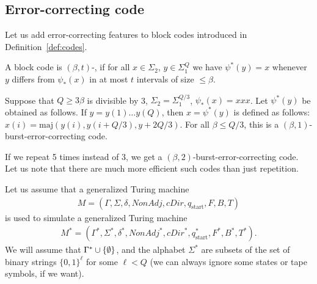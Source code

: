 \documentclass[12pt]{memoir}
\renewcommand{\le}{\leq}
\newcommand{\fld}[1]{\ensuremath{\textit{#1}}}
\newcommand{\maj}{\mathrm{maj}}
\def\B{B}
\newcommand{\Tu}{T}
\newcommand{\Tus}{T^{*}}
\newcommand{\cDir}{\fld{cDir}}
\newcommand{\NonAdj}{\fld{NonAdj}}
\newcommand{\start}{\mathrm{start}}
\begin{document}
\subsection{Error-correcting code}\label{sec:coding}

Let us add error-correcting features to block codes introduced in
Definition~\ref{def:codes}.

\begin{sloppypar}
\begin{definition}\label{def:err-code}
A block code is \( (\beta,t) \)-,
if for all \( x\in\Sigma_{2} \), \( y\in\Sigma_{1}^{Q} \) we
have \( \psi^{*}(y)=x \) whenever \( y \) differs from
\( \psi_{*}(x) \) in at most \( t \) intervals of size \( \le\beta \).
\end{definition}
  \end{sloppypar}

\begin{example}\label{xmp:tripling}
  Suppose that \( Q\ge 3\beta \) is divisible by 3,
  \( \Sigma_{2}=\Sigma_{1}^{Q/3} \), \( \psi_{*}(x)=xxx \).
  Let \( \psi^{*}(y) \) be obtained as follows.
  If \( y=y(1)\dots y(Q) \), then \( x=\psi^{*}(y) \) is defined as follows:
    \( x(i)=\maj(y(i),y(i+Q/3),y+2Q/3) \).
    For all \( \beta\le Q/3 \), this is a
    \( (\beta,1) \)-burst-error-correcting code.

    If we repeat 5 times instead of 3, we get a \( (\beta,2) \)-burst-error-correcting
    code.
    Let us note that there are much more efficient such codes than just repetition.
 \end{example}

Let us assume that a generalized Turing machine
\begin{align*}
    M = (\Gamma, \Sigma, \delta, \NonAdj, \cDir, q_{\start},F, \B, \Tu)
\end{align*}
is used to simulate a generalized Turing machine
\begin{align*}
M^* = (\Gamma^{*}, \Sigma^{*}, \delta^{*}, \NonAdj^{*}, \cDir^{*}, q^{*}_{\start},F^{*}, \B^{*}, \Tus).
\end{align*}
We will assume that \( \Gamma^*\cup\mathopen\{\emptyset\mathclose\} \),
and the alphabet \( \Sigma^* \) are subsets of the set of  binary strings
\( \{0,1\}^{\ell} \) for some \( \ell<Q \) (we can always ignore some states or tape
symbols, if we want).
\end{document}
